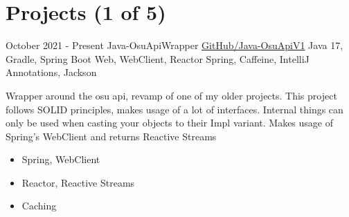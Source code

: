 \documentclass[letterpaper]{twentysecondcv} %
\begin{document}
\section{Projects (1 of 5)}
\begin{twenty} %
	\twentyitem
    		{October 2021 -}
		{Present}
        		{Java-OsuApiWrapper}
        		{\href{https://github.com/Tais993/Java-OsuApiV1/}{GitHub/Java-OsuApiV1}}
        		{Java 17, Gradle, Spring Boot Web, WebClient, Reactor Spring, Caffeine, IntelliJ Annotations, Jackson}
        		{
        		Wrapper around the osu api, revamp of one of my older projects.
        		This project follows SOLID principles, makes usage of a lot of interfaces.
        		Internal things can only be used when casting your objects to their Impl variant.
        		Makes usage of Spring's WebClient and returns Reactive Streams
        		\begin{itemize}
        		    \item Spring, WebClient
        		    \item Reactor, Reactive Streams
        		    \item Caching
                \end{itemize}}\\
\end{twenty}

\newpage

\makesidebarSecond %

\end{document}
